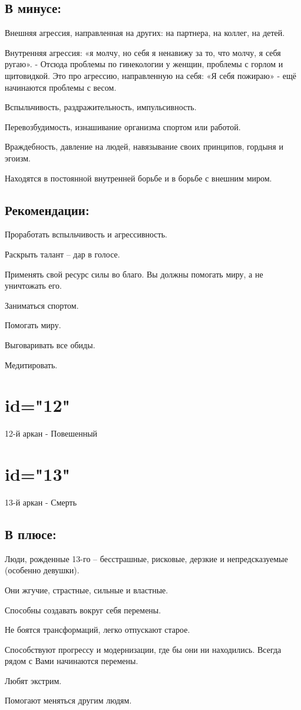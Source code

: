 \subsection{В минусе:}
\item Внешняя агрессия, направленная на других: на партнера, на коллег, на детей.
\item Внутренняя агрессия: «я молчу, но себя я ненавижу за то, что молчу, я себя ругаю». - Отсюда проблемы по гинекологии у женщин, проблемы с горлом и щитовидкой. Это про агрессию, направленную на себя: «Я себя пожираю» - ещё начинаются проблемы с весом.
\item Вспыльчивость, раздражительность, импульсивность.
\item Перевозбудимость, изнашивание организма спортом или работой.
\item Враждебность, давление на людей, навязывание своих принципов, гордыня и эгоизм.
\item Находятся в постоянной внутренней борьбе и в борьбе с внешним миром.
\endsubsection

\subsection{Рекомендации:}
\item Проработать вспыльчивость и агрессивность.
\item Раскрыть талант – дар в голосе.
\item Применять свой ресурс силы во благо. Вы должны помогать миру, а не уничтожать его.
\item Заниматься спортом.
\item Помогать миру.
\item Выговаривать все обиды.
\item Медитировать.
\endsubsection

\endsection

\section{id="12"}{12-й аркан - Повешенный}
\endsection

\section{id="13"}{13-й аркан - Смерть}

\subsection{В плюсе:}
\item Люди, рожденные 13-го – бесстрашные, рисковые, дерзкие и непредсказуемые (особенно девушки).
\item Они жгучие, страстные, сильные и властные.
\item Способны создавать вокруг себя перемены.
\item Не боятся трансформаций, легко отпускают старое.
\item Способствуют прогрессу и модернизации, где бы они ни находились. Всегда рядом с Вами начинаются перемены.
\item Любят экстрим.
\item Помогают меняться другим людям.
\endsubsection

